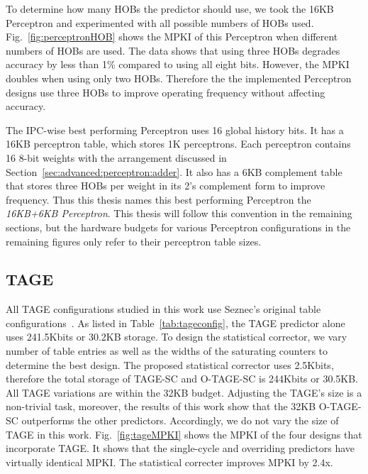 To determine how many HOBs the predictor should use, we took the 16KB Perceptron and experimented with all possible numbers of HOBs used. Fig.~\ref{fig:perceptronHOB} shows the MPKI of this Perceptron when different numbers of HOBs are used. The data shows that using three HOBs degrades accuracy by less than 1\% compared to using all eight bits. However, the MPKI doubles when using only two HOBs. Therefore the the implemented Perceptron designs use three HOBs to improve operating frequency without affecting accuracy.

The IPC-wise best performing Perceptron uses 16 global history bits. It has a 16KB perceptron table, which stores 1K perceptrons. Each perceptron contains 16 8-bit weights with the arrangement discussed in Section~\ref{sec:advanced:perceptron:adder}. It also has a 6KB complement table that stores three HOBs per weight in its 2's complement form to improve frequency. Thus this thesis names this best performing Perceptron the \textit{16KB+6KB Perceptron}. This thesis will follow this convention in the remaining sections, but the hardware budgets for various Perceptron configurations in the remaining figures only refer to their perceptron table sizes.

\subsection{TAGE}
\label{sec:eval:advanced:tage}
All TAGE configurations studied in this work use Seznec’s original table configurations~\cite{tage}. As listed in Table~\ref{tab:tageconfig}, the TAGE predictor alone uses 241.5Kbits or \mytilde30.2KB storage. To design the statistical corrector, we vary number of table entries as well as the widths of the saturating counters to determine the best design. The proposed statistical corrector uses 2.5Kbits, therefore the total storage of \mbox{TAGE-SC} and \mbox{O-TAGE-SC} is 244Kbits or 30.5KB. All TAGE variations are within the 32KB budget. Adjusting the TAGE's size is a non-trivial task, moreover, the results of this work show that the 32KB \mbox{O-TAGE-SC} outperforms the other predictors. Accordingly, we do not vary the size of TAGE in this work. Fig.~\ref{fig:tageMPKI} shows the MPKI of the four designs that incorporate TAGE. It shows that the single-cycle and overriding predictors have virtually identical MPKI. The statistical correcter improves MPKI by \mytilde 2.4x.


